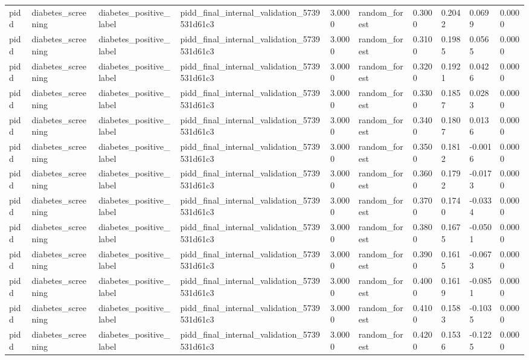 \begin{tabular}{llllllllll}
pidd & diabetes\_screening & diabetes\_positive\_label & pidd\_final\_internal\_validation\_5739531d61c3 & 3.0000 & random\_forest & 0.3000 & 0.2042 & 0.0699 & 0.0000 \\
pidd & diabetes\_screening & diabetes\_positive\_label & pidd\_final\_internal\_validation\_5739531d61c3 & 3.0000 & random\_forest & 0.3100 & 0.1985 & 0.0565 & 0.0000 \\
pidd & diabetes\_screening & diabetes\_positive\_label & pidd\_final\_internal\_validation\_5739531d61c3 & 3.0000 & random\_forest & 0.3200 & 0.1921 & 0.0426 & 0.0000 \\
pidd & diabetes\_screening & diabetes\_positive\_label & pidd\_final\_internal\_validation\_5739531d61c3 & 3.0000 & random\_forest & 0.3300 & 0.1857 & 0.0283 & 0.0000 \\
pidd & diabetes\_screening & diabetes\_positive\_label & pidd\_final\_internal\_validation\_5739531d61c3 & 3.0000 & random\_forest & 0.3400 & 0.1807 & 0.0136 & 0.0000 \\
pidd & diabetes\_screening & diabetes\_positive\_label & pidd\_final\_internal\_validation\_5739531d61c3 & 3.0000 & random\_forest & 0.3500 & 0.1812 & -0.0016 & 0.0000 \\
pidd & diabetes\_screening & diabetes\_positive\_label & pidd\_final\_internal\_validation\_5739531d61c3 & 3.0000 & random\_forest & 0.3600 & 0.1792 & -0.0173 & 0.0000 \\
pidd & diabetes\_screening & diabetes\_positive\_label & pidd\_final\_internal\_validation\_5739531d61c3 & 3.0000 & random\_forest & 0.3700 & 0.1740 & -0.0334 & 0.0000 \\
pidd & diabetes\_screening & diabetes\_positive\_label & pidd\_final\_internal\_validation\_5739531d61c3 & 3.0000 & random\_forest & 0.3800 & 0.1675 & -0.0501 & 0.0000 \\
pidd & diabetes\_screening & diabetes\_positive\_label & pidd\_final\_internal\_validation\_5739531d61c3 & 3.0000 & random\_forest & 0.3900 & 0.1615 & -0.0673 & 0.0000 \\
pidd & diabetes\_screening & diabetes\_positive\_label & pidd\_final\_internal\_validation\_5739531d61c3 & 3.0000 & random\_forest & 0.4000 & 0.1619 & -0.0851 & 0.0000 \\
pidd & diabetes\_screening & diabetes\_positive\_label & pidd\_final\_internal\_validation\_5739531d61c3 & 3.0000 & random\_forest & 0.4100 & 0.1583 & -0.1035 & 0.0000 \\
pidd & diabetes\_screening & diabetes\_positive\_label & pidd\_final\_internal\_validation\_5739531d61c3 & 3.0000 & random\_forest & 0.4200 & 0.1536 & -0.1225 & 0.0000 \\

\end{tabular}

